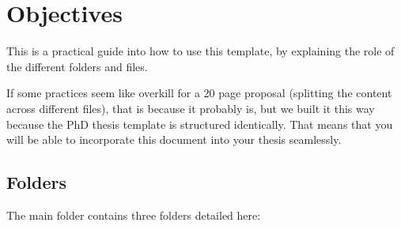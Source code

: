 \chapter{Objectives} \label{ch-2}

This is a practical guide into how to use this template, by explaining the role of the different folders and files.

If some practices seem like overkill for a 20 page proposal (splitting the content across different files), that is because it probably is, but we built it this way because the PhD thesis template is structured identically. That means that you will be able to incorporate this document into your thesis seamlessly.

\section{Folders}

The main folder contains three folders detailed here:


